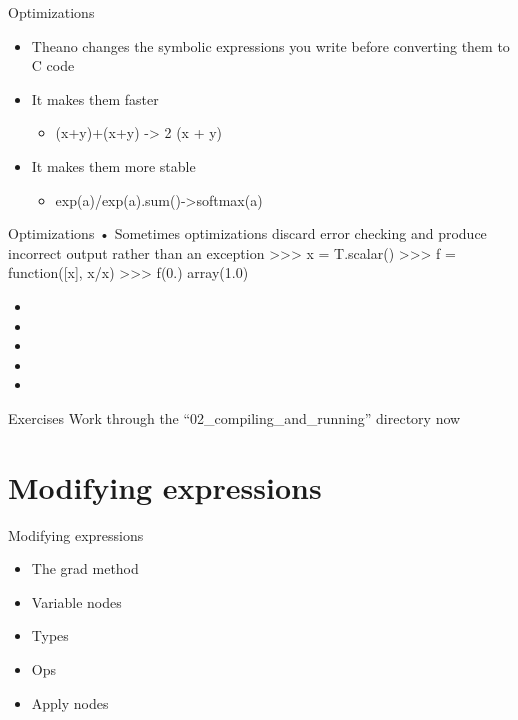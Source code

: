 \documentclass[utf8x,xcolor=pdftex,dvipsnames,table]{beamer}
\begin{document}
\begin{frame}{Optimizations}
  \begin{itemize}
  \item Theano changes the symbolic expressions
    you write before converting them to C code
  \item It makes them faster
  \begin{itemize}
  \item (x+y)+(x+y) -> 2 (x + y)
  \end{itemize}
  \item It makes them more stable
  \begin{itemize}
  \item exp(a)/exp(a).sum()->softmax(a)
  \end{itemize}
  \end{itemize}
\end{frame}

\begin{frame}{Optimizations}
• Sometimes optimizations discard error
checking and produce incorrect output
rather than an exception
>>> x = T.scalar()
>>> f = function([x], x/x)
>>> f(0.)
array(1.0)

  
  \begin{itemize}
  \item 
  \item 
  \item 
  \item 
  \item 
  \end{itemize}
\end{frame}

\begin{frame}{Exercises}
Work through the ``02\_compiling\_and\_running'' directory now
\end{frame}

\section{Modifying expressions}
\begin{frame}{Modifying expressions}
  \begin{itemize}
  \item The grad method
  \item Variable nodes
  \item Types
  \item Ops
  \item Apply nodes
  \end{itemize}
\end{frame}
\end{document}
